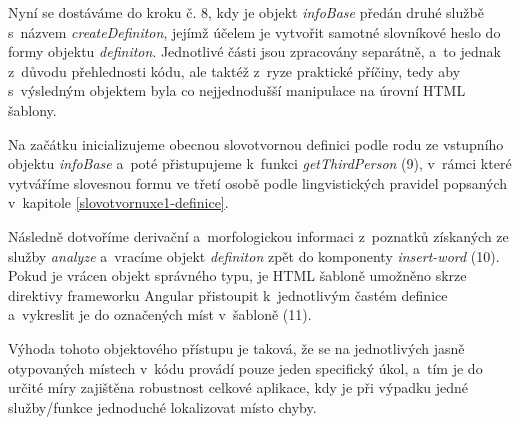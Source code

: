 Nyní se dostáváme do kroku č. 8, kdy je objekt \emph{infoBase} předán
druhé službě s~názvem \emph{createDefiniton}, jejímž účelem je vytvořit
samotné slovníkové heslo do formy objektu \emph{definiton}. Jednotlivé
části jsou zpracovány separátně, a~to jednak z~důvodu přehlednosti kódu,
ale taktéž z~ryze praktické příčiny, tedy aby s~výsledným objektem byla
co nejjednodušší manipulace na úrovní HTML šablony.

Na začátku inicializujeme obecnou slovotvornou definici podle rodu ze
vstupního objektu \emph{infoBase} a~poté přistupujeme k~funkci
\emph{getThirdPerson} (9), v~rámci které vytváříme slovesnou formu ve
třetí osobě podle lingvistických pravidel popsaných v~kapitole
\ref{slovotvornuxe1-definice}.

Následně dotvoříme derivační a~morfologickou informaci z~poznatků
získaných ze služby \emph{analyze} a~vracíme objekt \emph{definiton}
zpět do komponenty \emph{insert-word} (10). Pokud je vrácen objekt
správného typu, je HTML šabloně umožněno skrze direktivy frameworku
Angular přistoupit k~jednotlivým častém definice a~vykreslit je do
označených míst v~šabloně (11).

Výhoda tohoto objektového přístupu je taková, že se na jednotlivých
jasně otypovaných místech v~kódu provádí pouze jeden specifický úkol,
a~tím je do určité míry zajištěna robustnost celkové aplikace, kdy je při
výpadku jedné služby/funkce jednoduché lokalizovat místo chyby.
